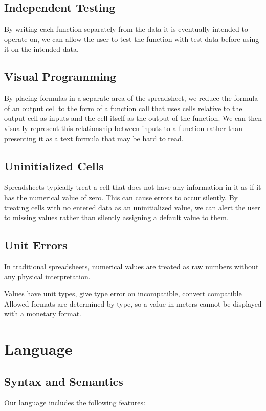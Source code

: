 \documentclass{acm_proc_article-sp}
\begin{document}
\subsection{Independent Testing}
By writing each function separately from the data it is eventually
intended to operate on, we can allow the user to test the function
with test data before using it on the intended data.

\subsection{Visual Programming}
By placing formulas in a separate area of the spreadsheet, we reduce
the formula of an output cell to the form of a function call that uses
cells relative to the output cell as inputs and the cell itself as the
output of the function. We can then visually represent this
relationship between inputs to a function rather than presenting it as
a text formula that may be hard to read.

\subsection{Uninitialized Cells}
Spreadsheets typically treat a cell that does not have any information
in it as if it has the numerical value of zero. This can cause errors
to occur silently. By treating cells with no entered data as an
uninitialized value, we can alert the user to missing values rather
than silently assigning a default value to them.

\subsection{Unit Errors}
In traditional spreadsheets, numerical values are treated as raw
numbers without any physical interpretation.

Values have unit types, give type error on incompatible, convert
compatible Allowed formats are determined by type, so a value in
meters cannot be displayed with a monetary format.

\section{Language}

\subsection{Syntax and Semantics}
Our language includes the following features:
\end{document}
